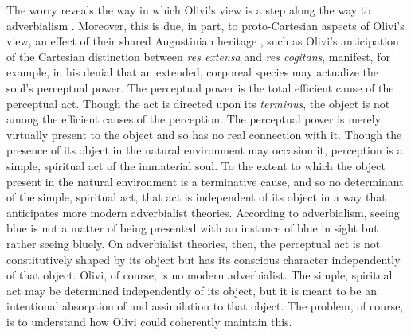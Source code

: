 The worry reveals the way in which Olivi's view is a step along the way to adverbialism \citep[see][]{Ducasse:1942oq}. Moreover, this is due, in part, to proto-Cartesian aspects of Olivi's view, an effect of their shared Augustinian heritage \citep[see][]{Menn:1998nr}, such as Olivi's anticipation of the Cartesian distinction between \emph{res extensa} and \emph{res cogitans}, manifest, for example, in his denial that an extended, corporeal species may actualize the soul's perceptual power. The perceptual power is the total efficient cause of the perceptual act. Though the act is directed upon its \emph{terminus}, the object is not among the efficient causes of the perception. The perceptual power is merely virtually present to the object and so has no real connection with it. Though the presence of its object in the natural environment may occasion it, perception is a simple, spiritual act of the immaterial soul. To the extent to which the object present in the natural environment is a terminative cause, and so no determinant of the simple, spiritual act, that act is independent of its object in a way that anticipates more modern adverbialist theories. According to adverbialism, seeing blue is not a matter of being presented with an instance of blue in sight but rather seeing bluely. On adverbialist theories, then, the perceptual act is not constitutively shaped by its object but has its conscious character independently of that object. Olivi, of course, is no modern adverbialist. The simple, spiritual act may be determined independently of its object, but it is meant to be an intentional absorption of and assimilation to that object. The problem, of course, is to understand how Olivi could coherently maintain this.

